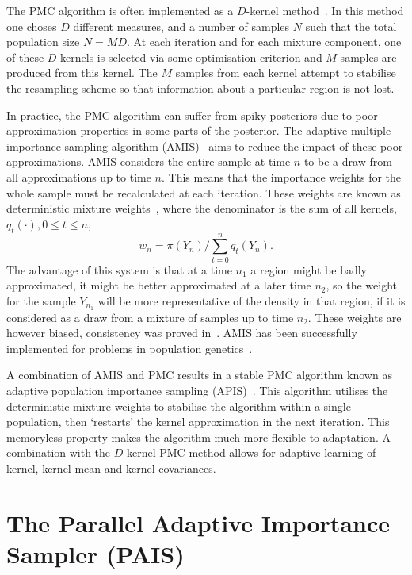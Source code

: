\documentclass[final]{siamltex}
\begin{document}
The PMC algorithm is often implemented as a $D$-kernel
method~\cite{douc2007convergence}. In this method one choses $D$
different measures, and a number of samples $N$ such that the total
population size $N = MD$. At each iteration and for each mixture
component, one of these $D$ kernels is selected via some optimisation
criterion and $M$ samples are produced from this kernel. The $M$
samples from each kernel attempt to stabilise the resampling scheme so
that information about a particular region is not lost.

In practice, the PMC algorithm can suffer from spiky posteriors due to
poor approximation properties in some parts of the posterior. The
adaptive multiple importance sampling algorithm
(AMIS)~\cite{cornuet2012adaptive} aims to reduce the impact of these
poor approximations. AMIS considers the entire sample at time $n$ to
be a draw from all approximations up to time $n$. This means that the
importance weights for the whole sample must be recalculated at each
iteration. These weights are known as deterministic mixture
weights~\cite{owen2000safe,veach1995optimally}, where the denominator
is the sum of all kernels, $q_t(\cdot), 0\leq t\leq n$,
\[
	w_n = \pi(Y_n) \Big/ \sum\limits_{t=0}^n \! q_t(Y_n).
\]
The advantage of this system is that at a time $n_1$ a region might be
badly approximated, it might be better approximated at a later time
$n_2$, so the weight for the sample $Y_{n_1}$ will be more
representative of the density in that region, if it is considered as a
draw from a mixture of samples up to time $n_2$. These weights are
however biased, consistency was proved in~\cite{marin2012consistency}.
AMIS has been successfully implemented for problems in population
genetics~\cite{siren2011reconstructing}.

A combination of AMIS and PMC results in a stable PMC algorithm known
as adaptive population importance sampling
(APIS)~\cite{martino2015adaptive}. This algorithm utilises the
deterministic mixture weights to stabilise the algorithm within a
single population, then `restarts' the kernel approximation in the
next iteration. This memoryless property makes the algorithm much more
flexible to adaptation. A combination with the $D$-kernel PMC method
allows for adaptive learning of kernel, kernel mean and kernel
covariances.

\section{The Parallel Adaptive Importance Sampler \allowbreak (PAIS)}\label{Sec:PAIS}
\end{document}
